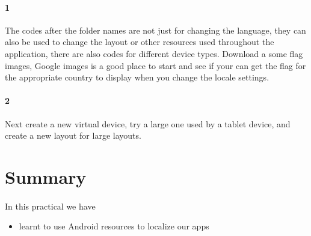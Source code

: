 \paragraph{1} The codes after the folder names are not just for changing the language, they can also be used to change the layout or other resources used throughout the application, there are also codes for different device types.
Download a some flag images, Google images is a good place to start and see if your can get the flag for the appropriate country to display when you change the locale settings.

\paragraph{2} Next create a new virtual device, try a large one used by a tablet device, and create a new layout for large layouts.



\section{Summary}
\paragraph{} In this practical we have 

\begin{itemize}
\item learnt to use Android resources to localize our apps 
\end{itemize}


